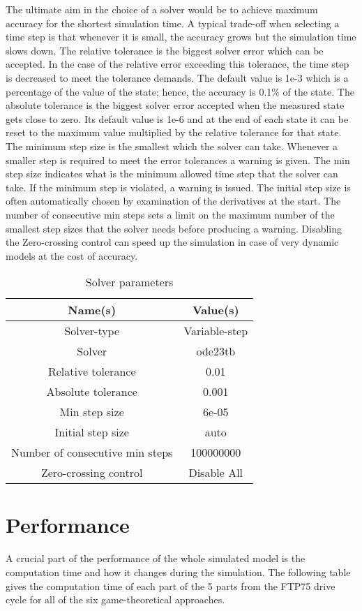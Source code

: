 The ultimate aim in the choice of a solver would be to achieve maximum accuracy for the shortest simulation time. A typical trade-off when selecting a time step is that whenever it is small, the accuracy grows but the simulation time slows down. The relative tolerance is the biggest solver error which can be accepted. In the case of the relative error exceeding this tolerance, the time step is decreased to meet the tolerance demands. The default value is 1e-3 which is a percentage of the value of the state; hence, the accuracy is 0.1\% of the state. The absolute tolerance is the biggest solver error accepted when the measured state gets close to zero. Its default value is 1e-6 and at the end of each state it can be reset to the maximum value multiplied by the relative tolerance for that state. The minimum step size is the smallest which the solver can take. Whenever a smaller step is required to meet the error tolerances a warning is given. The min step size indicates what is the minimum allowed time step that the solver can take. If the minimum step is violated, a warning is issued. The initial step size is often automatically chosen by examination of the derivatives at the start. The number of consecutive min steps sets a limit on the maximum number of the smallest step sizes that the solver needs before producing a warning. Disabling the Zero-crossing control can speed up the simulation in case of very dynamic models at the cost of accuracy.

\begin{table}[h]
\centering
\begin{tabular}{ |c|c| } 
 \hline
 Name(s) & Value(s) \\
 \hline\hline
 Solver-type & Variable-step  \\ 
 Solver & ode23tb \\ 
 Relative tolerance & 0.01 \\ 
 Absolute tolerance & 0.001 \\
 Min step size & 6e-05 \\
 Initial step size & auto \\ 
 Number of consecutive min steps & 100000000 \\
 Zero-crossing control & Disable All \\
 \hline
\end{tabular}
\caption{Solver parameters}
\label{tab:config}
\end{table}

\section{Performance}
A crucial part of the performance of the whole simulated model is the computation time and how it changes during the simulation. The following table gives the computation time of each part of the 5 parts from the FTP75 drive cycle for all of the six game-theoretical approaches.

